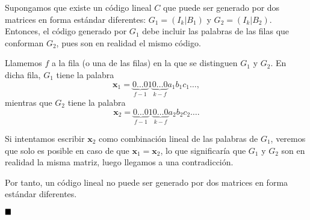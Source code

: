 Supongamos que existe un código lineal $C$ que puede ser generado por dos matrices en forma estándar diferentes: $G_1 = (I_k|B_1)$ y $G_2 = (I_k|B_2)$. Entonces, el código generado por $G_1$ debe incluir las palabras de las filas que conforman $G_2$, pues son en realidad el mismo código.

Llamemos $f$ a la fila (o una de las filas) en la que se distinguen $G_1$ y $G_2$. En dicha fila, $G_1$ tiene la palabra
\[\textbf{x}_1 = \underbrace{0\hdots0}_\text{$f-1$}1\underbrace{0\hdots0}_\text{$k-f$}a_1b_1c_1\hdots,\]
mientras que $G_2$ tiene la palabra
\[\textbf{x}_2 = \underbrace{0\hdots0}_\text{$f-1$}1\underbrace{0\hdots0}_\text{$k-f$}a_2b_2c_2\hdots.\]

Si intentamos escribir $\textbf{x}_2$ como combinación lineal de las palabras de $G_1$, veremos que solo es posible en caso de que $\textbf{x}_1 = \textbf{x}_2$, lo que significaría que $G_1$ y $G_2$ son en realidad la misma matriz, luego llegamos a una contradicción.

Por tanto, un código lineal no puede ser generado por dos matrices en forma estándar diferentes.

$\qed$
